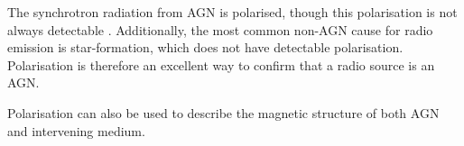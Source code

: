             The synchrotron radiation from AGN is polarised, though this polarisation is not always detectable \citeneeded {}. Additionally, the most common non-AGN cause for radio emission is star-formation, which does not have detectable polarisation. Polarisation is therefore an excellent way to confirm that a radio source is an AGN.

            Polarisation can also be used to describe the magnetic structure of both AGN and intervening medium.

